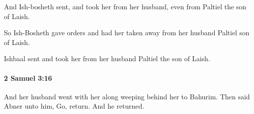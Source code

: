 			\begin{versebox}
					\item[BHS] 
					\item[ASV] And Ish-bosheth sent, and took her from her husband, even from Paltiel the son of Laish.
					\item[NIV] So Ish-Bosheth gave orders and had her taken away from her husband Paltiel son of Laish.
					\item[NRSV] Ishbaal sent and took her from her husband Paltiel the son of Laish.
			\end{versebox}

		\paragraph{2 Samuel 3:16} %
			\label{2SAMUEL-3-16}

			And her husband went with her along weeping behind her to Bahurim. Then said Abner unto him, Go, return. And he returned.

